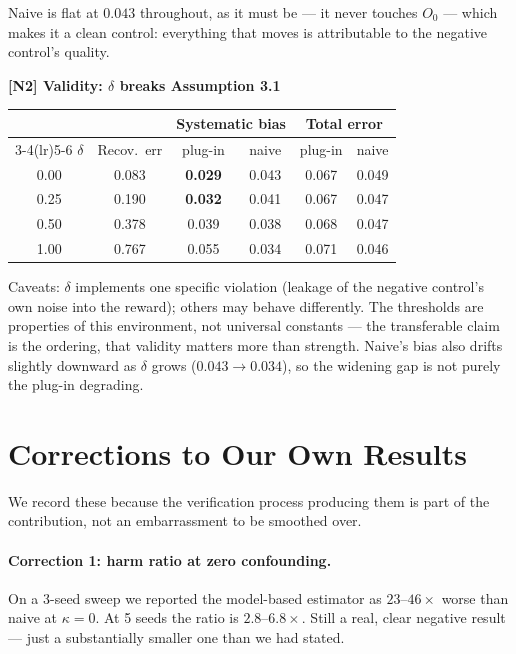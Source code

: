 Naive is flat at $0.043$ throughout, as it must be --- it never touches $O_0$ ---
which makes it a clean control: everything that moves is attributable to the
negative control's quality.

\begin{center}\small
\textbf{[N2] Validity: $\delta$ breaks Assumption 3.1}\\[2pt]
\begin{tabular}{@{}cccccc@{}}
\toprule
& & \multicolumn{2}{c}{Systematic bias} & \multicolumn{2}{c}{Total error} \\
\cmidrule(lr){3-4}\cmidrule(lr){5-6}
$\delta$ & Recov.\ err & plug-in & naive & plug-in & naive \\
\midrule
0.00 & 0.083 & \textbf{0.029} & 0.043 & 0.067 & 0.049 \\
0.25 & 0.190 & \textbf{0.032} & 0.041 & 0.067 & 0.047 \\
0.50 & 0.378 & 0.039 & 0.038 & 0.068 & 0.047 \\
1.00 & 0.767 & 0.055 & 0.034 & 0.071 & 0.046 \\
\bottomrule
\end{tabular}
\end{center}

Caveats: $\delta$ implements one specific violation (leakage of the negative
control's own noise into the reward); others may behave differently. The
thresholds are properties of this environment, not universal constants --- the
transferable claim is the ordering, that validity matters more than strength.
Naive's bias also drifts slightly downward as $\delta$ grows
($0.043 \to 0.034$), so the widening gap is not purely the plug-in degrading.

\section{Corrections to Our Own Results}
\label{app:corrections}

We record these because the verification process producing them is part of the
contribution, not an embarrassment to be smoothed over.

\paragraph{Correction 1: harm ratio at zero confounding.} On a 3-seed sweep we
reported the model-based estimator as $23$--$46\times$ worse than naive at
$\kappa = 0$. At 5 seeds the ratio is $2.8$--$6.8\times$. Still a real, clear
negative result --- just a substantially smaller one than we had stated.


